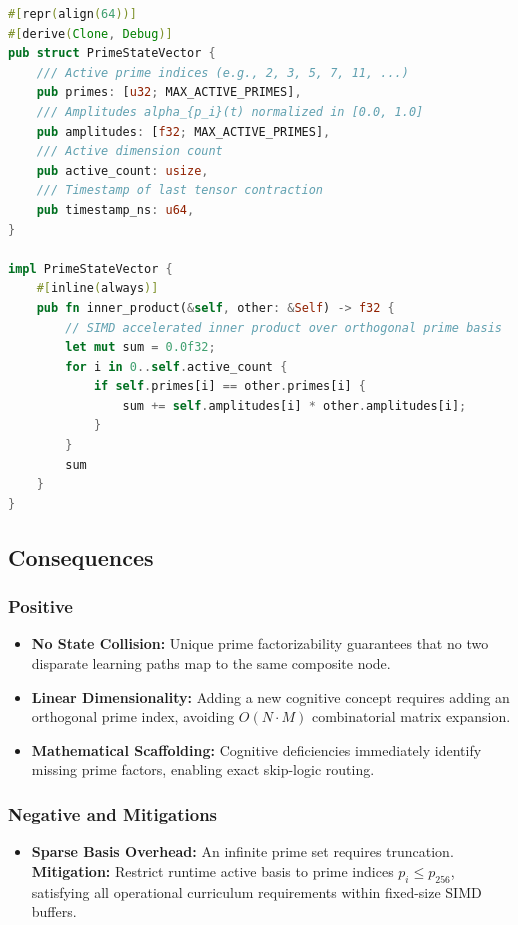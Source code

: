 \begin{lstlisting}[language=Rust, caption={Cache-Aligned Prime State Vector in Rust}]
#[repr(align(64))]
#[derive(Clone, Debug)]
pub struct PrimeStateVector {
    /// Active prime indices (e.g., 2, 3, 5, 7, 11, ...)
    pub primes: [u32; MAX_ACTIVE_PRIMES],
    /// Amplitudes alpha_{p_i}(t) normalized in [0.0, 1.0]
    pub amplitudes: [f32; MAX_ACTIVE_PRIMES],
    /// Active dimension count
    pub active_count: usize,
    /// Timestamp of last tensor contraction
    pub timestamp_ns: u64,
}

impl PrimeStateVector {
    #[inline(always)]
    pub fn inner_product(&self, other: &Self) -> f32 {
        // SIMD accelerated inner product over orthogonal prime basis
        let mut sum = 0.0f32;
        for i in 0..self.active_count {
            if self.primes[i] == other.primes[i] {
                sum += self.amplitudes[i] * other.amplitudes[i];
            }
        }
        sum
    }
}
\end{lstlisting}

\subsection{Consequences}
\subsubsection{Positive}
\begin{itemize}
    \item \textbf{No State Collision:} Unique prime factorizability guarantees that no two disparate learning paths map to the same composite node.
    \item \textbf{Linear Dimensionality:} Adding a new cognitive concept requires adding an orthogonal prime index, avoiding $O(N \cdot M)$ combinatorial matrix expansion.
    \item \textbf{Mathematical Scaffolding:} Cognitive deficiencies immediately identify missing prime factors, enabling exact skip-logic routing.
\end{itemize}

\subsubsection{Negative and Mitigations}
\begin{itemize}
    \item \textbf{Sparse Basis Overhead:} An infinite prime set requires truncation. \textbf{Mitigation:} Restrict runtime active basis to prime indices $p_i \le p_{256}$, satisfying all operational curriculum requirements within fixed-size SIMD buffers.
\end{itemize}
